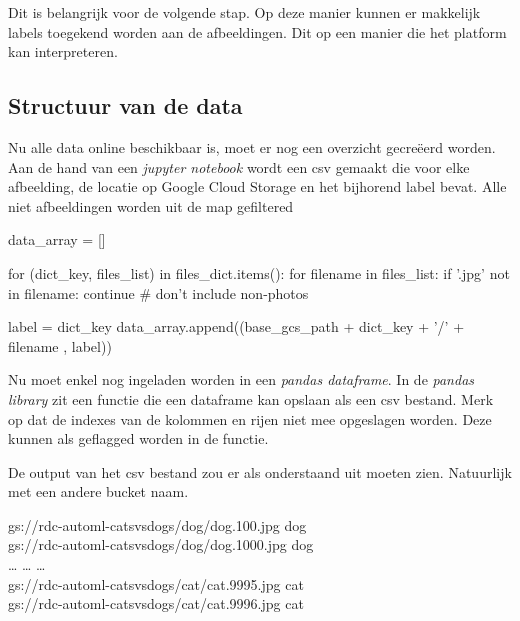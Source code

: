 
Dit is belangrijk voor de volgende stap. Op deze manier kunnen er makkelijk labels toegekend worden aan de afbeeldingen. Dit op een manier die het platform kan interpreteren.

\subsection{Structuur van de data}
\label{subsec:google-structure}

Nu alle data online beschikbaar is, moet er nog een overzicht gecreëerd worden. Aan de hand van een \textit{jupyter notebook} wordt een csv gemaakt die voor elke afbeelding, de locatie op Google Cloud Storage en het bijhorend label bevat. Alle niet afbeeldingen worden uit de map gefiltered

\begin{python}
data_array = []

for (dict_key, files_list) in files_dict.items():
    for filename in files_list:
        if '.jpg' not in filename:
            continue # don't include non-photos
            
        label = dict_key
        data_array.append((base_gcs_path + dict_key + '/' + filename , label))

\end{python}

Nu moet  enkel nog ingeladen worden in een \textit{pandas dataframe}. In de \textit{pandas library} zit een functie die een dataframe kan opslaan als een csv bestand. Merk op dat de indexes van de kolommen en rijen niet mee opgeslagen worden. Deze kunnen als  geflagged worden in de functie.


De output van het csv bestand zou er als onderstaand uit moeten zien. Natuurlijk met een andere bucket naam.

gs://rdc-automl-catsvsdogs/dog/dog.100.jpg dog \\
gs://rdc-automl-catsvsdogs/dog/dog.1000.jpg dog \\
… … … \\
gs://rdc-automl-catsvsdogs/cat/cat.9995.jpg cat \\
gs://rdc-automl-catsvsdogs/cat/cat.9996.jpg cat
\\

